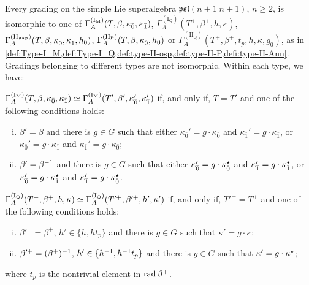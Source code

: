 \begin{thm}\label{thm:final-A(n-n)}
    Every grading on the simple Lie superalgebra ${\mathfrak{psl}(n+1 | n+1)}$, $n\geq 2$, is isomorphic to one of 
    $\Gamma^{\mathrm{(I_M)}}_A(T, \beta, \kappa_{\bar{0}}, \kappa_{\bar{1}})$, $\Gamma^{\mathrm{(I_Q)}}_A(T^+, \beta^+, h, \kappa)$, $\Gamma^{\mathrm{(II_{\mathfrak{osp}})}}_A(T, \beta, \kappa_{\bar{0}}, \kappa_{\bar{1}}, h_0)$, $\Gamma_A^{\mathrm{(II_P)}}(T, \beta, \kappa_{\bar{0}}, h_0)$ or $\Gamma_A^{\mathrm{(II_Q)}}(T^+, \beta^+, t_p, h, \kappa, g_0)$, as in \cref{def:Type-I_M,def:Type-I_Q,def:type-II-osp,def:type-II-P,defi:type-II-Ann}. 
    Gradings belonging to different types are not isomorphic. 
    Within each type, we have:
    
    \noindent{}
        
        \noindent$\Gamma^{\mathrm{(I_M)}}_A(T, \beta, \kappa_{\bar{0}}, \kappa_{\bar{1}}) 
        \simeq 
        \Gamma^{\mathrm{(I_M)}}_A(T', \beta', \kappa_{\bar{0}}', \kappa_{\bar{1}}')$ if, and only if, $T = T'$ and one of the following conditions holds:
	\begin{enumerate}[(i)]
	    \item $\beta'=\beta$ and there is $g\in G$ such that either $\kappa_{\bar 0}'=g \cdot \kappa_{\bar 0}$ and $\kappa_{\bar 1}'=g \cdot \kappa_{\bar 1}$, or $\kappa_{\bar 0}'=g \cdot \kappa_{\bar 1}$ and $\kappa_{\bar 1}'=g \cdot \kappa_{\bar 0}$; 
	    \item $\beta'=\beta^{-1}$ and there is $g\in G$ such that either $\kappa_{\bar 0}'=g \cdot \kappa_{\bar 0}^\star$ and $\kappa_{\bar 1}'=g \cdot \kappa_{\bar 1}^\star$, or $\kappa_{\bar 0}'=g \cdot \kappa_{\bar 1}^\star$ and $\kappa_{\bar 1}'=g \cdot \kappa_{\bar 0}^\star$. 
	\end{enumerate}
       
    \noindent{}
    
        \noindent $\Gamma^{\mathrm{(I_Q)}}_A(T^+, \beta^+, h, \kappa)
        \simeq    \Gamma^{\mathrm{(I_Q)}}_A(T'^+, \beta'^+, h', \kappa')$ if, and only if, $T'^+ = T^+$ and one of the following conditions holds:
    \begin{enumerate}[(i)]
	    \item $\beta'^+=\beta^+$, $h' \in \{ h, h t_p \}$ and there is $g\in G$ such that $\kappa' = g \cdot \kappa$;
	    \item $\beta'^+= (\beta^+)^{-1}$, $h' \in \{ h^{-1}, h^{-1} t_p \}$ and there is $g\in G$ such that $\kappa' = g \cdot \kappa^\star$; 
	\end{enumerate}
	where $t_p$ is the nontrivial element in $\operatorname{rad} \beta^+$. 
        

\end{thm}
